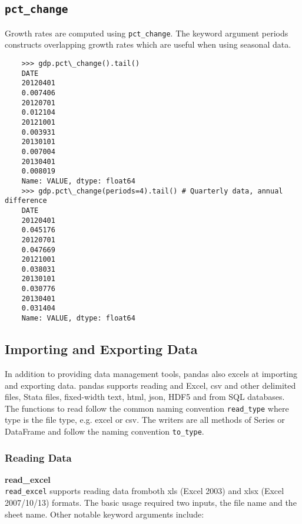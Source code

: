 \documentclass[KSmain.tex]{subfiles}
\begin{document}
\subsection*{\texttt{pct\_change}}
	Growth rates are computed using \texttt{pct\_change}. The keyword argument periods constructs overlapping
	growth rates which are useful when using seasonal data.
\begin{framed}	\begin{verbatim}
	>>> gdp.pct\_change().tail()
	DATE
	20120401
	0.007406
	20120701
	0.012104
	20121001
	0.003931
	20130101
	0.007004
	20130401
	0.008019
	Name: VALUE, dtype: float64
	>>> gdp.pct\_change(periods=4).tail() # Quarterly data, annual difference
	DATE
	20120401
	0.045176
	20120701
	0.047669
	20121001
	0.038031
	20130101
	0.030776
	20130401
	0.031404
	Name: VALUE, dtype: float64
\end{verbatim}
\end{framed}

	\subsection{Importing and Exporting Data}
	In addition to providing data management tools, pandas also excels at importing and exporting data. pandas
	supports reading and Excel, csv and other delimited files, Stata files, fixed-width text, html, json, HDF5
	and from SQL databases. The functions to read follow the common naming convention \texttt{read\_type} where
	type is the file type, e.g. excel or csv. The writers are all methods of Series or DataFrame and follow the
	naming convention \texttt{to\_type}.
	

	\subsubsection{Reading Data}
	\textbf{read\_excel}\\
		\texttt{read\_excel} supports reading data fromboth xls (Excel 2003) and xlsx (Excel 2007/10/13) formats. The basic usage required two inputs, the file name and the sheet name. Other notable keyword arguments include:
\end{document}
